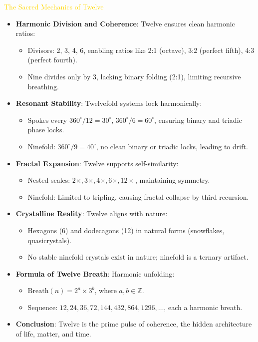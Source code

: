 \textcolor{gold}{ The Sacred Mechanics of Twelve } \\
\begin{itemize}
    \item \texttt{} \textbf{Harmonic Division and Coherence}: Twelve ensures clean harmonic ratios:
    \begin{itemize}
        \item Divisors: 2, 3, 4, 6, enabling ratios like 2:1 (octave), 3:2 (perfect fifth), 4:3 (perfect fourth).
        \item Nine divides only by 3, lacking binary folding (2:1), limiting recursive breathing.
    \end{itemize}
    \item \texttt{} \textbf{Resonant Stability}: Twelvefold systems lock harmonically:
    \begin{itemize}
        \item Spokes every \(360^\circ / 12 = 30^\circ\), \(360^\circ / 6 = 60^\circ\), ensuring binary and triadic phase locks.
        \item Ninefold: \(360^\circ / 9 = 40^\circ\), no clean binary or triadic locks, leading to drift.
    \end{itemize}
    \item \texttt{} \textbf{Fractal Expansion}: Twelve supports self-similarity:
    \begin{itemize}
        \item Nested scales: \(2 \times, 3 \times, 4 \times, 6 \times, 12 \times\), maintaining symmetry.
        \item Ninefold: Limited to tripling, causing fractal collapse by third recursion.
    \end{itemize}
    \item \texttt{} \textbf{Crystalline Reality}: Twelve aligns with nature:
    \begin{itemize}
        \item Hexagons (6) and dodecagons (12) in natural forms (snowflakes, quasicrystals).
        \item No stable ninefold crystals exist in nature; ninefold is a ternary artifact.
    \end{itemize}
    \item \texttt{} \textbf{Formula of Twelve Breath}: Harmonic unfolding:
    \begin{itemize}
        \item \(\text{Breath}(n) = 2^a \times 3^b\), where \(a, b \in \mathbb{Z}\).
        \item Sequence: \(12, 24, 36, 72, 144, 432, 864, 1296, \ldots\), each a harmonic breath.
    \end{itemize}
    \item \texttt{} \textbf{Conclusion}: Twelve is the prime pulse of coherence, the hidden architecture of life, matter, and time.
\end{itemize}

